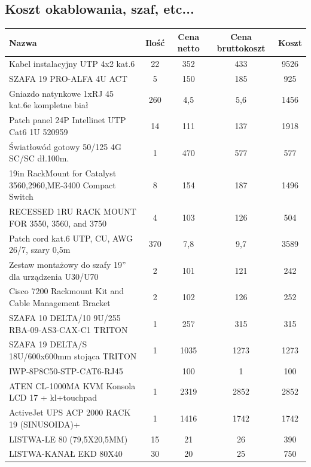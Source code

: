 \subsection{Koszt okablowania, szaf, etc...}
\begin{center}
    \begin{tabular}{|p{6cm}|c|c|c|c|}
    \hline
Nazwa &	Ilość	&Cena netto	&Cena bruttokoszt	&Koszt \\ \hline
Kabel instalacyjny UTP 4x2 kat.6	&22&	352	&433	&9526\\ \hline
SZAFA 19 PRO-ALFA 4U ACT	&5	&150	&185	&925\\ \hline
Gniazdo natynkowe 1xRJ 45 kat.6e kompletne biał	&260	&4,5	&5,6	&1456\\ \hline
Patch panel 24P Intellinet UTP Cat6 1U 520959	&14	&111	&137	&1918\\ \hline
Światłowód gotowy 50/125 4G SC/SC dł.100m.	&1&	470&	577&	577\\ \hline
19in RackMount for Catalyst 3560,2960,ME-3400 Compact Switch	&8	&154	&187	&1496\\ \hline
RECESSED 1RU RACK MOUNT FOR 3550, 3560, and 3750	&4	&103	&126	&504\\ \hline
Patch cord kat.6 UTP, CU, AWG 26/7, szary 0,5m&	370&	7,8&	9,7&	3589\\ \hline
Zestaw montażowy do szafy 19” dla urządzenia U30/U70	&2	&101	&121	&242\\ \hline
Cisco 7200 Rackmount Kit and Cable Management Bracket	&2	&102	&126	&252\\ \hline
SZAFA 10 DELTA/10 9U/255 RBA-09-AS3-CAX-C1 TRITON	&1	&257	&315	&315\\ \hline
SZAFA 19 DELTA/S 18U/600x600mm stojąca TRITON	&1	&1035	&1273	&1273 \\ \hline
IWP-8P8C50-STP-CAT6-RJ45&	&100		&1	&100\\ \hline
ATEN CL-1000MA KVM Konsola LCD 17 + kl+touchpad	&1	&2319	&2852	&2852 \\ \hline
ActiveJet UPS ACP 2000 RACK 19 (SINUSOIDA)+	&1	&1416	&1742	&1742 \\ \hline
LISTWA-LE 80  (79,5X20,5MM)&15	& 21 	&26	&390 \\ \hline
LISTWA-KANAŁ EKD 80X40	& 30	& 20 & 25	&750 \\ \hline

\end{tabular}
\end{center}

